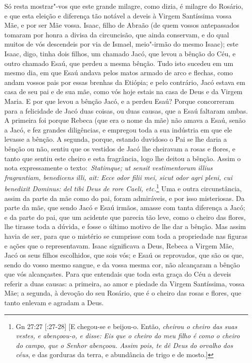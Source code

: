 Só resta mostrar"-vos que este grande milagre, como dizia, é
milagre do Rosário, e que esta eleição e diferença tão notável a deveis
à Virgem Santíssima vossa Mãe, e por ser Mãe vossa. Isaac, filho de
Abraão (de quem vossos antepassados tomaram por honra a divisa da
circuncisão, que ainda conservam, e do qual muitos de vós descendeis por
via de Ismael, meio"-irmão do mesmo Isaac); este Isaac, digo, tinha
dois filhos, um chamado Jacó, que levou a bênção do Céu, e outro chamado
Esaú, que perdeu a mesma bênção. Tudo isto sucedeu em um mesmo dia, em
que Esaú andava pelos matos armado de arco e flechas, como andam vossos
pais por essas brenhas da Etiópia; e pelo contrário, Jacó estava em casa
de seu pai e de sua mãe, como vós hoje estais na casa de Deus e da
Virgem Maria. E por que levou a bênção Jacó, e a perdeu Esaú? Porque
concorreram para a felicidade de Jacó duas coisas, ou duas causas, que a
Esaú faltaram ambas. A primeira foi porque Rebeca (que era o nome da
mãe) não amava a Esaú, senão a Jacó, e fez grandes diligências, e
empregou toda a sua indústria em que ele levasse a bênção. A segunda,
porque, estando duvidoso o Pai se lhe daria a bênção ou não, sentiu que
os vestidos de Jacó lhe cheiravam a rosas e flores, e tanto que sentiu
este cheiro e esta fragrância, logo lhe deitou a bênção. Assim o nota
expressamente o texto:~\emph{Statimque; ut sensit vestimentorum illius
fragrantiam, benedicens illi, ait: Ecce odor filii mei, sicut odor agri
pleni, cui benedixit Dominus: del tibi Deus de rore Caeli,
etc.}\footnote{Gn 27:27 [:27-28] [E chegou-se e beijou-o. Então, \textit{cheirou o cheiro das suas vestes, e abençoou-o, e disse: Eis que o cheiro do meu filho é como o cheiro do campo, que o Senhor abençoou. Assim pois, te dê Deus do orvalho dos céus}, e das gorduras da terra, e abundância de trigo e de mosto.]} Uma e outra circunstância, assim da parte da mãe como do pai, foram admiráveis, e por isso misteriosas. Da parte da mãe,
que sendo Jacó e Esaú irmãos, amasse com tanta diferença a Jacó; e da
parte do pai, que um acidente que parecia tão leve, como o cheiro das
flores, lhe tirasse toda a dúvida, e fosse o último motivo de lhe dar a
bênção. Mas assim havia de ser, para que o mistério se cumprisse com
toda a propriedade nas figuras e ações que o representavam. Isaac
significava a Deus, Rebeca a Virgem Mãe, Jacó os seus filhos escolhidos,
que sois vós; e Esaú os reprovados, que são os que, sendo do vosso mesmo
sangue, e da vossa mesma cor, não alcançaram a bênção que vós
alcançastes. Para que entendais que toda esta graça do Céu a deveis
referir a duas causas: a primeira, ao amor e piedade da Virgem
Santíssima, vossa Mãe; a segunda, à devoção do seu Rosário, que é o
cheiro das rosas e flores, que tanto enlevam e agradam a Deus.

